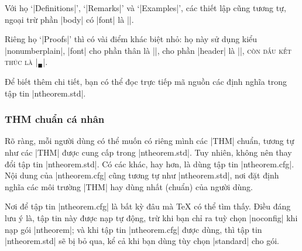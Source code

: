 Với họ `|Definitions|', `|Remarks|' và `|Examples|', các thiết lập cũng
tương tự, ngoại trừ phần |body| có |font|  là |\upshape|.

\medskip
Riêng họ `|Proofs|' thì có vài điểm khác biệt nhỏ: họ này sử dụng
kiểu |nonumberplain|, |font| cho phần thân là |\upshape|,
cho phần |header| là |\scshape|, còn dấu kết thúc là |\ensuremath{_\blacksquare}|.

\medskip
Để biết thêm chi tiết, bạn có thể đọc trực tiếp mã nguồn
các định nghĩa trong tập tin |ntheorem.std|.

\subsubsection{THM chuẩn cá nhân}
\label{sec:private.thm}

Rõ ràng, mỗi người dùng có thể muốn có riêng mình các |THM|
chuẩn, tương tự như các |THM| được cung cấp trong |ntheorem.std|.
Tuy nhiên, không nên thay đổi tập tin |ntheorem.std|.
Có các khác, hay hơn, là dùng tập tin |ntheorem.cfg|.
Nội dung của |ntheorem.cfg| cũng tương tự như |ntheorem.std|,
nơi đặt định nghĩa các môi trường |THM| hay dùng nhất (chuẩn)
của người dùng.

\medskip
Nơi để tập tin |ntheorem.cfg| là bất kỳ đâu mà \TeX{} có thể tìm
thấy. Điều đáng lưu ý là, tập tin này được nạp tự động,
trừ khi bạn chỉ ra tuỳ chọn |noconfig| khi nạp gói |ntheorem|;
và khi tập tin |ntheorem.cfg| được dùng, thì tập tin |ntheorem.std|
sẽ bị bỏ qua, kể cả khi bạn dùng tùy chọn |standard| cho gói.

